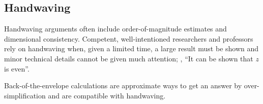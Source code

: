 \subsection{Handwaving}
Handwaving arguments often include order-of-magnitude estimates and dimensional consistency. Competent, well-intentioned researchers and professors rely on handwaving when, given a limited time, a large result must be shown and minor technical details cannot be given much attention; \eg, ``It can be shown that $z$ is even''.

Back-of-the-envelope calculations are approximate ways to get an answer by over-simplification and are compatible with handwaving.


